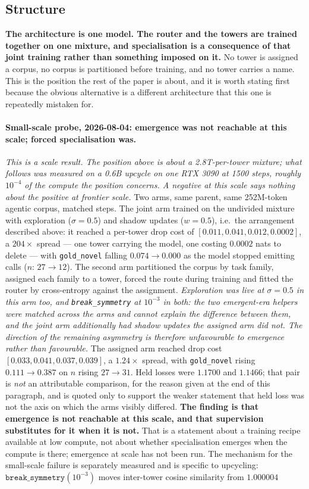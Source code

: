 \documentclass[11pt]{article}
\begin{document}
\subsection{Structure}

\textbf{The architecture is one model. The router and the towers are trained together on one mixture, and specialisation is a consequence of that joint training rather than something imposed on it.} No tower is assigned a corpus, no corpus is partitioned before training, and no tower carries a name. This is the position the rest of the paper is about, and it is worth stating first because the obvious alternative is a different architecture that this one is repeatedly mistaken for.

\paragraph{Small-scale probe, 2026-08-04: emergence was not reachable at this scale; forced specialisation was.} \emph{This is a scale result. The position above is about a 2.8T-per-tower mixture; what follows was measured on a 0.6B upcycle on one RTX 3090 at 1500 steps, roughly $10^{-4}$ of the compute the position concerns. A negative at this scale says nothing about the positive at frontier scale.} Two arms, same parent, same 252M-token agentic corpus, matched steps. The joint arm trained on the undivided mixture with exploration ($\sigma{=}0.5$) and shadow updates ($w{=}0.5$), i.e.\ the arrangement described above: it reached a per-tower drop cost of $[0.011, 0.041, 0.012, 0.0002]$, a $204\times$ spread --- one tower carrying the model, one costing $0.0002$ nats to delete --- with \texttt{gold\_novel} falling $0.074 \to 0.000$ as the model stopped emitting calls ($n$: $27 \to 12$). The second arm partitioned the corpus by task family, assigned each family to a tower, forced the route during training and fitted the router by cross-entropy against the assignment. \emph{Exploration was live at $\sigma{=}0.5$ in this arm too, and \texttt{break\_symmetry} at $10^{-3}$ in both: the two emergent-era helpers were matched across the arms and cannot explain the difference between them, and the joint arm additionally had shadow updates the assigned arm did not. The direction of the remaining asymmetry is therefore unfavourable to emergence rather than favourable.} The assigned arm reached drop cost $[0.033, 0.041, 0.037, 0.039]$, a $1.24\times$ spread, with \texttt{gold\_novel} rising $0.111 \to 0.387$ on $n$ rising $27 \to 31$. Held losses were $1.1700$ and $1.1466$; that pair is \emph{not} an attributable comparison, for the reason given at the end of this paragraph, and is quoted only to support the weaker statement that held loss was not the axis on which the arms visibly differed. \textbf{The finding is that emergence is not reachable at this scale, and that supervision substitutes for it when it is not.} That is a statement about a training recipe available at low compute, not about whether specialisation emerges when the compute is there; emergence at scale has not been run. The mechanism for the small-scale failure is separately measured and is specific to upcycling: $\texttt{break\_symmetry}(10^{-3})$ moves inter-tower cosine similarity from $1.000004$ 
\end{document}
